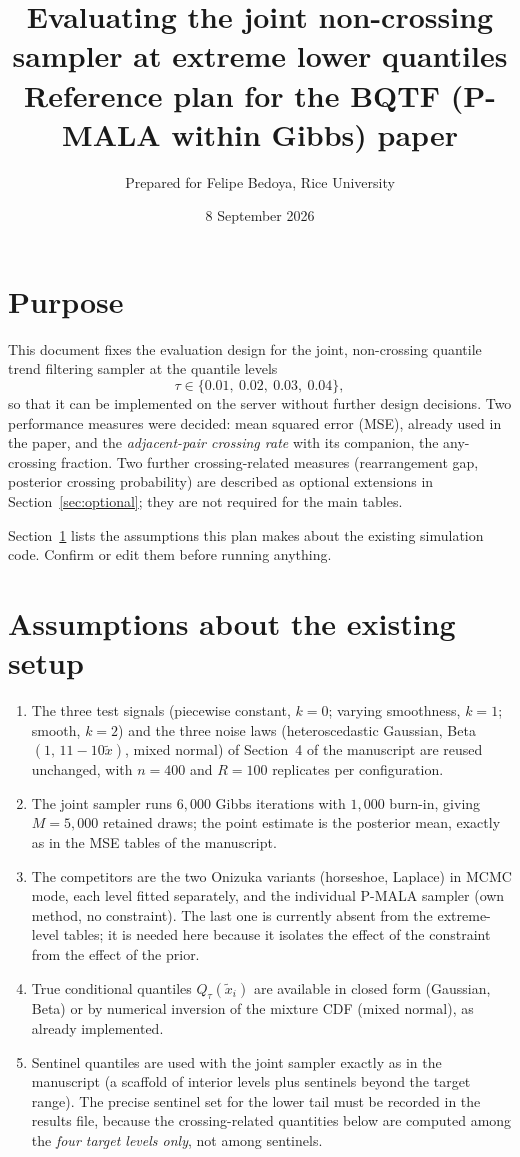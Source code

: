 \documentclass[11pt]{article}
\title{\textbf{Evaluating the joint non-crossing sampler at extreme lower quantiles}\\[4pt]
\large Reference plan for the BQTF (P-MALA within Gibbs) paper}
\author{Prepared for Felipe Bedoya, Rice University}
\date{8 September 2026}
\begin{document}
\maketitle

\section*{Purpose}

This document fixes the evaluation design for the joint, non-crossing quantile trend filtering sampler at the quantile levels
\[
\tau \in \{0.01,\ 0.02,\ 0.03,\ 0.04\},
\]
so that it can be implemented on the server without further design decisions. Two performance measures were decided: mean squared error (MSE), already used in the paper, and the \emph{adjacent-pair crossing rate} with its companion, the any-crossing fraction. Two further crossing-related measures (rearrangement gap, posterior crossing probability) are described as optional extensions in Section~\ref{sec:optional}; they are not required for the main tables.

Section~\ref{sec:assume} lists the assumptions this plan makes about the existing simulation code. Confirm or edit them before running anything.

\section{Assumptions about the existing setup}
\label{sec:assume}

\begin{enumerate}[leftmargin=*]
\item The three test signals (piecewise constant, $k=0$; varying smoothness, $k=1$; smooth, $k=2$) and the three noise laws (heteroscedastic Gaussian, Beta$(1,\,11-10\tilde x)$, mixed normal) of Section~4 of the manuscript are reused unchanged, with $n=400$ and $R=100$ replicates per configuration.
\item The joint sampler runs $6{,}000$ Gibbs iterations with $1{,}000$ burn-in, giving $M=5{,}000$ retained draws; the point estimate is the posterior mean, exactly as in the MSE tables of the manuscript.
\item The competitors are the two Onizuka variants (horseshoe, Laplace) in MCMC mode, each level fitted separately, and the individual P-MALA sampler (own method, no constraint). The last one is currently absent from the extreme-level tables; it is needed here because it isolates the effect of the constraint from the effect of the prior.
\item True conditional quantiles $Q_\tau(\tilde x_i)$ are available in closed form (Gaussian, Beta) or by numerical inversion of the mixture CDF (mixed normal), as already implemented.
\item Sentinel quantiles are used with the joint sampler exactly as in the manuscript (a scaffold of interior levels plus sentinels beyond the target range). The precise sentinel set for the lower tail must be recorded in the results file, because the crossing-related quantities below are computed among the \emph{four target levels only}, not among sentinels.
\end{enumerate}
\end{document}

